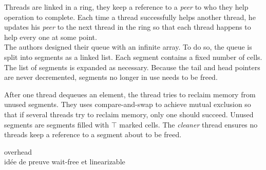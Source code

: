 Threads are linked in a ring, they keep a reference to a \textit{peer} to who
they help operation to complete. Each time a thread successfully helps another
thread, he updates his \textit{peer} to the next thread in the ring so that each
thread happens to help every one at some point. \\

 The authors designed their queue with an infinite
array. To do so, the queue is split into segments as a linked list. Each segment
contains a fixed number of cells. The list of segments is expanded as necessary.
Because the tail and head pointers are never decremented, segments no longer in
use needs to be freed.

After one thread dequeues an element, the thread tries to reclaim memory from
unused segments. They uses compare-and-swap to achieve mutual exclusion so that
if several threads try to reclaim memory, only one should succeed. Unused
segments are segments filled with $\top$ marked cells. The \textit{cleaner}
thread ensures no threads keep a reference to a segment about to be freed.

overhead \\

idée de preuve wait-free et linearizable
